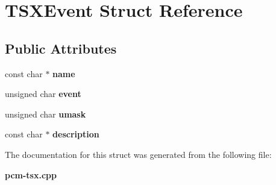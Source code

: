 \section{T\+S\+X\+Event Struct Reference}
\label{structTSXEvent}
\subsection*{Public Attributes}
\begin{DoxyCompactItemize}
\item 
const char $\ast$ {\bfseries name}\label{structTSXEvent_a592441448f28d73655c864f5dbb77538}

\item 
unsigned char {\bfseries event}\label{structTSXEvent_a45969e694e699c485379594701bd7e35}

\item 
unsigned char {\bfseries umask}\label{structTSXEvent_a2f1b2f588a4641abde0dd5bd7870a537}

\item 
const char $\ast$ {\bfseries description}\label{structTSXEvent_aae0d6de90f1596c51b6c0345356a1076}

\end{DoxyCompactItemize}


The documentation for this struct was generated from the following file\+:\begin{DoxyCompactItemize}
\item 
{\bf pcm-\/tsx.\+cpp}\end{DoxyCompactItemize}
